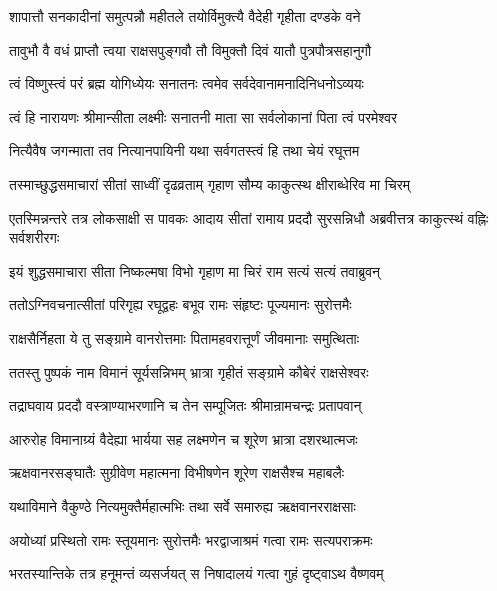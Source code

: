 \twolineshloka
{शापात्तौ सनकादीनां समुत्पन्नौ महीतले}
{तयोर्विमुक्त्यै वैदेही गृहीता दण्डके वने}%

\twolineshloka
{तावुभौ वै वधं प्राप्तौ त्वया राक्षसपुङ्गवौ}
{तौ विमुक्तौ दिवं यातौ पुत्रपौत्रसहानुगौ}%

\twolineshloka
{त्वं विष्णुस्त्वं परं ब्रह्म योगिध्येयः सनातनः}
{त्वमेव सर्वदेवानामनादिनिधनोऽव्ययः}%

\twolineshloka
{त्वं हि नारायणः श्रीमान्सीता लक्ष्मीः सनातनी}
{माता सा सर्वलोकानां पिता त्वं परमेश्वर}%

\twolineshloka
{नित्यैवैष जगन्माता तव नित्यानपायिनी}
{यथा सर्वगतस्त्वं हि तथा चेयं रघूत्तम}%

\twolineshloka
{तस्माच्छुद्धसमाचारां सीतां साध्वीं दृढव्रताम्}
{गृहाण सौम्य काकुत्स्थ क्षीराब्धेरिव मा चिरम्}%



\threelineshloka
{एतस्मिन्नन्तरे तत्र लोकसाक्षी स पावकः}
{आदाय सीतां रामाय प्रददौ सुरसन्निधौ}
{अब्रवीत्तत्र काकुत्स्थं वह्निः सर्वशरीरगः}%


\twolineshloka
{इयं शुद्धसमाचारा सीता निष्कल्मषा विभो}
{गृहाण मा चिरं राम सत्यं सत्यं तवाब्रुवन्}%


\twolineshloka
{ततोऽग्निवचनात्सीतां परिगृह्य रघूद्वहः}
{बभूव रामः संहृष्टः पूज्यमानः सुरोत्तमैः}%

\twolineshloka
{राक्षसैर्निहता ये तु सङ्ग्रामे वानरोत्तमाः}
{पितामहवरात्तूर्णं जीवमानाः समुत्थिताः}%

\twolineshloka
{ततस्तु पुष्पकं नाम विमानं सूर्यसन्निभम्}
{भ्रात्रा गृहीतं सङ्ग्रामे कौबेरं राक्षसेश्वरः}%

\twolineshloka
{तद्राघवाय प्रददौ वस्त्राण्याभरणानि च}
{तेन सम्पूजितः श्रीमान्रामचन्द्रः प्रतापवान्}%

\twolineshloka
{आरुरोह विमानाग्र्यं वैदेह्या भार्यया सह}
{लक्ष्मणेन च शूरेण भ्रात्रा दशरथात्मजः}%

\twolineshloka
{ऋक्षवानरसङ्घातैः सुग्रीवेण महात्मना}
{विभीषणेन शूरेण राक्षसैश्च महाबलैः}%

\twolineshloka
{यथाविमाने वैकुण्ठे नित्यमुक्तैर्महात्मभिः}
{तथा सर्वे समारुह्य ऋक्षवानरराक्षसाः}%

\twolineshloka
{अयोध्यां प्रस्थितो रामः स्तूयमानः सुरोत्तमैः}
{भरद्वाजाश्रमं गत्वा रामः सत्यपराक्रमः}%

\twolineshloka
{भरतस्यान्तिके तत्र हनूमन्तं व्यसर्जयत्}
{स निषादालयं गत्वा गुहं दृष्ट्वाऽथ वैष्णवम्}%

